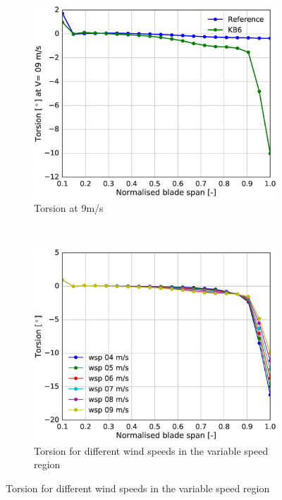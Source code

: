 \begin{figure}[tph]
\begin{subfigure}{0.50\textwidth}
\includegraphics[width=\linewidth]{figures/KB6_final/KB6_torsion_09.eps}
\caption{Torsion at 9m/s}
\label{subfig:KB6_tors_posn}
\end{subfigure}
 ~
\begin{subfigure}{0.50\textwidth}
\includegraphics[width=\linewidth]{figures/KB6_final/KB6_torsion_diffwsp.eps}
\caption{Torsion for different wind speeds in the variable speed region}
\label{subfig:KB6_tors_posn_diffwsp}
\end{subfigure}


\end{figure}
